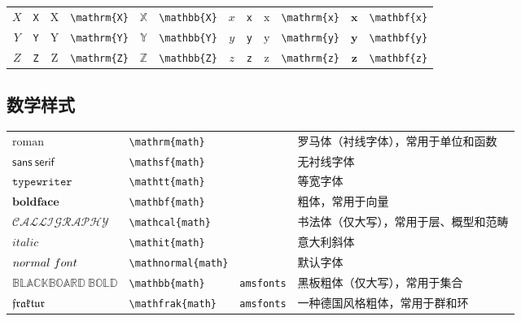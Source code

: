 \begin{table}[th]
\begin{tabular}{ c@{ }l c@{ }l c@{ }l c@{ }l c@{ }l c@{ }l}
		$X$ & \verb|X| & $\mathrm{X}$ & \verb|\mathrm{X}| & $\mathbb{X}$ & \verb|\mathbb{X}| & $x$ & \verb|x| & $\mathrm{x}$ & \verb|\mathrm{x}| & $\mathbf{x}$ & \verb|\mathbf{x}| \\
		$Y$ & \verb|Y| & $\mathrm{Y}$ & \verb|\mathrm{Y}| & $\mathbb{Y}$ & \verb|\mathbb{Y}| & $y$ & \verb|y| & $\mathrm{y}$ & \verb|\mathrm{y}| & $\mathbf{y}$ & \verb|\mathbf{y}| \\
		$Z$ & \verb|Z| & $\mathrm{Z}$ & \verb|\mathrm{Z}| & $\mathbb{Z}$ & \verb|\mathbb{Z}| & $z$ & \verb|z| & $\mathrm{z}$ & \verb|\mathrm{z}| & $\mathbf{z}$ & \verb|\mathbf{z}| \\
		\hline
	\end{tabular}
\end{table}

\newpage
\subsection{数学样式}

\begin{table}[h]
	\centering
	\begin{tabular}{l l l l}
		\hline
		$\mathrm{roman}$            & \verb|\mathrm{|{\color{gray}\verb|math|}\verb|}|     &                 & 罗马体（衬线字体），常用于单位和函数 \\
		$\mathsf{sans\ serif}$      & \verb|\mathsf{|{\color{gray}\verb|math|}\verb|}|     &                 & 无衬线字体 \\
		$\mathtt{typewriter}$       & \verb|\mathtt{|{\color{gray}\verb|math|}\verb|}|     &                 & 等宽字体 \\
		$\mathbf{bold face}$        & \verb|\mathbf{|{\color{gray}\verb|math|}\verb|}|     &                 & 粗体，常用于向量 \\
		$\mathcal{CALLIGRAPHY}$     & \verb|\mathcal{|{\color{gray}\verb|math|}\verb|}|    &                 & 书法体（仅大写），常用于层、概型和范畴 \\
		$\mathit{italic}$           & \verb|\mathit{|{\color{gray}\verb|math|}\verb|}|     &                 & 意大利斜体 \\
		$\mathnormal{normal\ font}$ & \verb|\mathnormal{|{\color{gray}\verb|math|}\verb|}| &                 & 默认字体 \\
		\hline
		$\mathbb{BLACKBOARD\ BOLD}$ & \verb|\mathbb{|{\color{gray}\verb|math|}\verb|}|     & \verb|amsfonts| & 黑板粗体（仅大写），常用于集合 \\
		$\mathfrak{fraktur}$        & \verb|\mathfrak{|{\color{gray}\verb|math|}\verb|}|   & \verb|amsfonts| & 一种德国风格粗体，常用于群和环 \\
		\hline
	\end{tabular}
\end{table}
